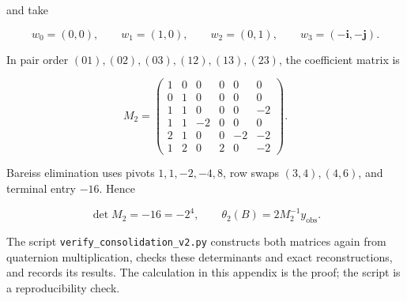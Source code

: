 \documentclass[
  11pt,
]{article}
\begin{document}
and take

\[
w_0=(0,0),\qquad w_1=(1,0),\qquad w_2=(0,1),
\qquad w_3=(-\mathbf i,-\mathbf j).
\]

In pair order \((01),(02),(03),(12),(13),(23)\), the coefficient matrix
is

\[
M_2=\begin{pmatrix}
1&0&0&0&0&0\\
0&1&0&0&0&0\\
1&1&0&0&0&-2\\
1&1&-2&0&0&0\\
2&1&0&0&-2&-2\\
1&2&0&2&0&-2
\end{pmatrix}.
\]

Bareiss elimination uses pivots \(1,1,-2,-4,8\), row swaps
\((3,4),(4,6)\), and terminal entry \(-16\). Hence

\[
\det M_2=-16=-2^4,
\qquad
\theta_2(B)=2M_2^{-1}y_{\mathrm{obs}}.
\]

The script \texttt{verify\_consolidation\_v2.py} constructs both
matrices again from quaternion multiplication, checks these determinants
and exact reconstructions, and records its results. The calculation in
this appendix is the proof; the script is a reproducibility check.
\end{document}

